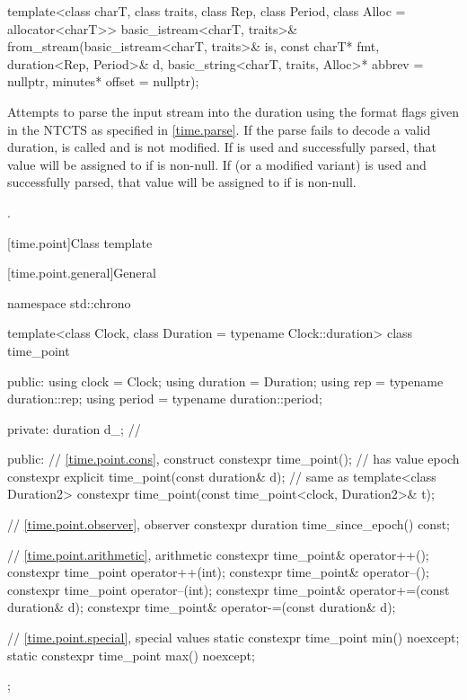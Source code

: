 %
\begin{itemdecl}
template<class charT, class traits, class Rep, class Period, class Alloc = allocator<charT>>
  basic_istream<charT, traits>&
    from_stream(basic_istream<charT, traits>& is, const charT* fmt,
                duration<Rep, Period>& d,
                basic_string<charT, traits, Alloc>* abbrev = nullptr,
                minutes* offset = nullptr);
\end{itemdecl}

\begin{itemdescr}
\pnum
\effects
Attempts to parse the input stream 
into the duration 
using the format flags given in the NTCTS 
as specified in \ref{time.parse}.
If the parse fails to decode a valid duration,
 is called and  is not modified.
If  is used and successfully parsed,
that value will be assigned to  if  is non-null.
If  (or a modified variant) is used and successfully parsed,
that value will be assigned to  if  is non-null.

\pnum
\returns
{}.
\end{itemdescr}

[time.point]{Class template }

[time.point.general]{General}

%
\begin{codeblock}
namespace std::chrono {
  template<class Clock, class Duration = typename Clock::duration>
  class time_point {
  public:
    using clock    = Clock;
    using duration = Duration;
    using rep      = typename duration::rep;
    using period   = typename duration::period;

  private:
    duration d_;                                                // \expos

  public:
    // \ref{time.point.cons}, construct
    constexpr time_point();                                     // has value epoch
    constexpr explicit time_point(const duration& d);           // same as 
    template<class Duration2>
      constexpr time_point(const time_point<clock, Duration2>& t);

    // \ref{time.point.observer}, observer
    constexpr duration time_since_epoch() const;

    // \ref{time.point.arithmetic}, arithmetic
    constexpr time_point& operator++();
    constexpr time_point operator++(int);
    constexpr time_point& operator--();
    constexpr time_point operator--(int);
    constexpr time_point& operator+=(const duration& d);
    constexpr time_point& operator-=(const duration& d);

    // \ref{time.point.special}, special values
    static constexpr time_point min() noexcept;
    static constexpr time_point max() noexcept;
  };
}
\end{codeblock}

